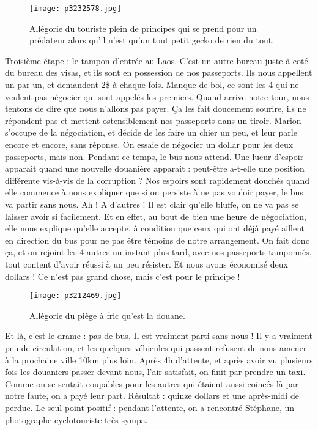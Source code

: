 \documentclass{book}
\begin{document}
\begin{figure}[h]
\centering
\texttt{[image: p3232578.jpg]}
\caption*{Allégorie du touriste plein de principes qui se prend pour un prédateur alors qu'il n'est qu'un tout petit gecko de rien du tout.}
\end{figure}

Troisième étape : le tampon d'entrée au Laos. C'est un autre bureau juste à coté du bureau des visas, et ils sont en possession de nos passeports. Ils nous appellent un par un, et demandent 2\$ à chaque fois. Manque de bol, ce sont les 4 qui ne veulent pas négocier qui sont appelés les premiers. Quand arrive notre tour, nous tentons de dire que nous n'allons pas payer. Ça les fait doucement sourire, ils ne répondent pas et mettent ostensiblement nos passeports dans un tiroir. Marion s'occupe de la négociation, et décide de les faire un chier un peu, et leur parle encore et encore, sans réponse. On essaie de négocier un dollar pour les deux passeports, mais non. Pendant ce temps, le bus nous attend. Une lueur d'espoir apparait quand une nouvelle douanière apparait : peut-être a-t-elle une position différente vis-à-vis de la corruption ? Nos espoirs sont rapidement douchés quand elle commence à nous expliquer que si on persiste à ne pas vouloir payer, le bus va partir sans nous. Ah ! A d'autres ! Il est clair qu'elle bluffe, on ne va pas se laisser avoir si facilement. Et en effet, au bout de bien une heure de négociation, elle nous explique qu'elle accepte, à condition que ceux qui ont déjà payé aillent en direction du bus pour ne pas être témoins de notre arrangement. On fait donc ça, et on rejoint les 4 autres un instant plus tard, avec nos passeports tamponnés, tout content d'avoir réussi à un peu résister. Et nous avons économisé deux dollars ! Ce n'est pas grand chose, mais c'est pour le principe !


\begin{figure}[h]
\centering
\texttt{[image: p3212469.jpg]}
\caption*{Allégorie du piège à fric qu'est la douane.}
\end{figure}

Et là, c'est le drame : pas de bus. Il est vraiment parti sans nous ! Il y a vraiment peu de circulation, et les quelques véhicules qui passent refusent de nous amener à la prochaine ville 10km plus loin. Après 4h d'attente, et après avoir vu plusieurs fois les douaniers passer devant nous, l'air satisfait, on finit par prendre un taxi. Comme on se sentait coupables pour les autres qui étaient aussi coincés là par notre faute, on a payé leur part. Résultat : quinze dollars et une après-midi de perdue. Le seul point positif : pendant l'attente, on a rencontré Stéphane, un photographe cyclotouriste très sympa.
\end{document}
